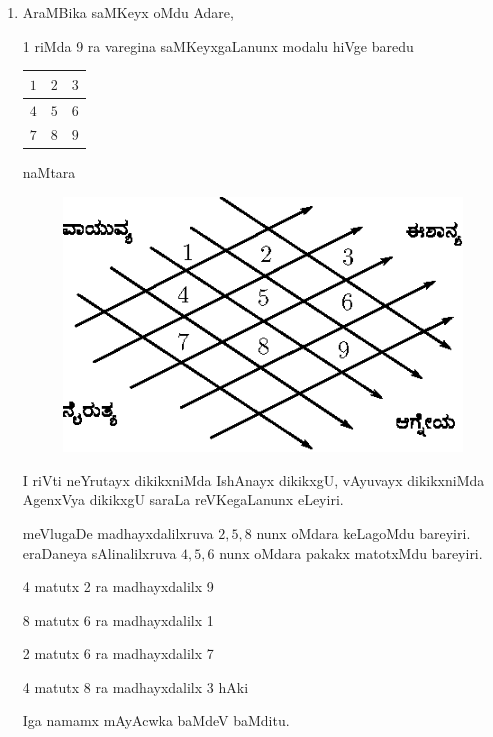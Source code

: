 \begin{enumerate}[{\rm I.}]
\item AraMBika saMKeyx oMdu Adare,

 {\rm 1} riMda {\rm 9} ra varegina saMKeyxgaLanunx modalu hiVge baredu

\hspace{3cm}
\begin{tabular}[c]{|>{$}c<{$}|>{$}c<{$}|>{$}c<{$}|}
\hline
1 & 2 & 3\\
\hline
4 & 5 & 6\\
\hline
7 & 8 & 9\\
\hline
\end{tabular}

naMtara
\begin{figure}[H]
\centering
\includegraphics[scale=.5]{src/figures/m_116.eps}
\end{figure}
\vskip -3pt

I riVti neYrutayx dikikxniMda IshAnayx dikikxgU, vAyuvayx dikikxniMda AgenxVya dikikxgU saraLa reVKegaLanunx eLeyiri.

meVlugaDe madhayxdalilxruva $2, 5, 8$ nunx oMdara keLagoMdu bareyiri. eraDa\-neya sAlinalilxruva $4, 5, 6$ nunx oMdara pakakx matotxMdu bareyiri.

{\rm 4} matutx {\rm 2} ra madhayxdalilx {\rm 9}

{\rm 8} matutx {\rm 6} ra madhayxdalilx {\rm 1}

{\rm 2} matutx {\rm 6} ra madhayxdalilx {\rm 7}

{\rm 4} matutx {\rm 8} ra madhayxdalilx {\rm 3} hAki

Iga namamx mAyAcwka baMdeV baMditu.

\hspace{3cm}
%


\end{enumerate}
